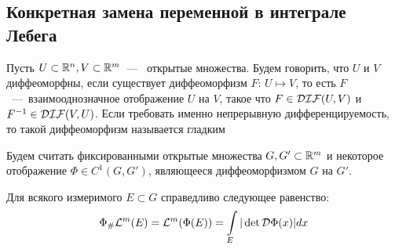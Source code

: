 \subsection{Конкретная замена переменной в интеграле Лебега}
\begin{reminder}
    Пусть $U \subset \mathbb{R}^n, V \subset \mathbb{R}^m$~---~ открытые множества. Будем говорить, что $U$ и $V$ диффеоморфны, если существует диффеоморфизм $F$: $U \mapsto V$, то есть $F$~---~взаимооднозначное отображение $U$ на $V$, такое что $F \in \mathcal{DIF}(U, V)$ и  $F^{-1} \in \mathcal{DIF}(V, U)$. Если требовать именно непрерывную дифференцируемость, то такой диффеоморфизм называется гладким
\end{reminder}
Будем считать фиксированными открытые множества $G, G' \subset \mathbb{R}^m$ и некоторое отображение $\Phi \in C^1(G, G')$, являющееся диффеоморфизмом $G$ на $G'$.
\begin{theorem}
    Для всякого измеримого $E \subset G$ справедливо следующее равенство: \[\Phi_\#\mathcal{L}^m(E) = \mathcal{L}^m(\Phi(E)) = \int\limits_E|\det \mathcal{D}\Phi(x)|dx\]
\end{theorem}
